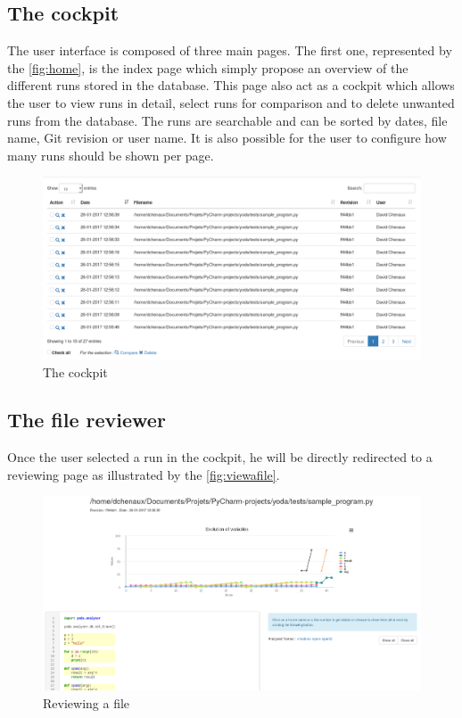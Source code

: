 \subsection{The cockpit}
The user interface is composed of three main pages. The first one, represented by the \autoref{fig:home}, is the index page which simply propose an overview of the different runs stored in the database. This page also act as a cockpit which allows the user to view runs in detail, select runs for comparison and to delete unwanted runs from the database. The runs are searchable and can be sorted by dates, file name, Git revision or user name. It is also possible for the user to configure how many runs should be shown per page.
\begin{figure}[h!]
  \centering
    \includegraphics[width=\textwidth]{figures/yoda-home.png}
    \caption{The cockpit}
    \label{fig:home}
\end{figure}

\subsection{The file reviewer}
Once the user selected a run in the cockpit, he will be directly redirected to a reviewing page as illustrated by the \autoref{fig:viewafile}. 
\begin{figure}[h!]
  \centering
    \includegraphics[width=\textwidth]{figures/yoda-file.png}
    \caption{Reviewing a file}
    \label{fig:viewafile}
\end{figure}

